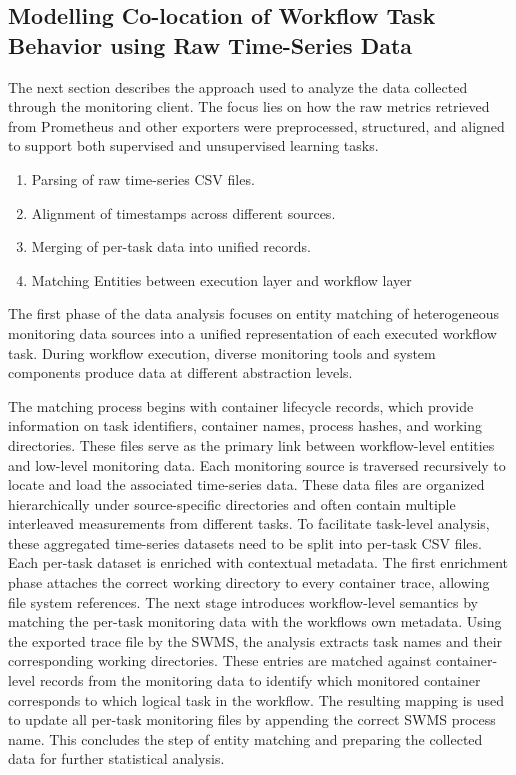 \subsection{Modelling Co-location of Workflow Task Behavior using Raw Time-Series Data}
\label{sec:data_analysis}
The next section describes the approach used to analyze the data collected through the monitoring client. The focus lies on how the raw metrics retrieved from Prometheus and other exporters were preprocessed, structured, and aligned to support both supervised and unsupervised learning tasks.

\begin{enumerate}
    \item Parsing of raw time-series CSV files.
    \item Alignment of timestamps across different sources.
    \item Merging of per-task data into unified records.
    \item Matching Entities between execution layer and workflow layer
\end{enumerate}

The first phase of the data analysis focuses on entity matching of heterogeneous monitoring data sources into a unified representation of each executed workflow task. During workflow execution, diverse monitoring tools and system components produce data at different abstraction levels.

The matching process begins with container lifecycle records, which provide information on task identifiers, container names, process hashes, and working directories. These files serve as the primary link between workflow-level entities and low-level monitoring data. Each monitoring source is traversed recursively to locate and load the associated time-series data. These data files are organized hierarchically under source-specific directories and often contain multiple interleaved measurements from different tasks. To facilitate task-level analysis, these aggregated time-series datasets need to be split into per-task CSV files.
Each per-task dataset is enriched with contextual metadata. The first enrichment phase attaches the correct working directory to every container trace, allowing file system references.
The next stage introduces workflow-level semantics by matching the per-task monitoring data with the workflows own metadata. Using the exported trace file by the SWMS, the analysis extracts task names and their corresponding working directories. These entries are matched against container-level records from the monitoring data to identify which monitored container corresponds to which logical task in the workflow. The resulting mapping is used to update all per-task monitoring files by appending the correct SWMS process name. This concludes the step of entity matching and preparing the collected data for further statistical analysis.

